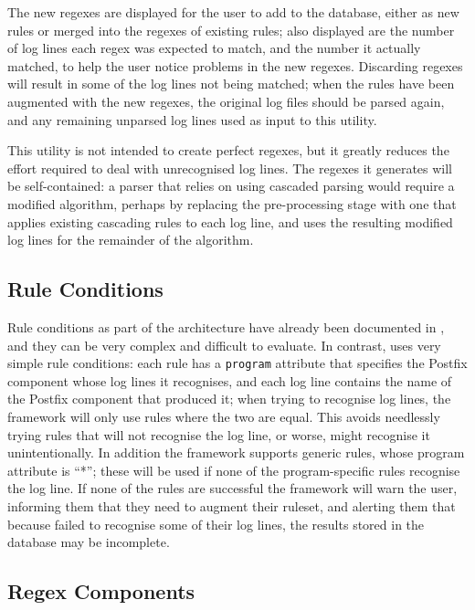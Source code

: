 The new regexes are displayed for the user to add to the database, either
as new rules or merged into the regexes of existing rules; also displayed
are the number of log lines each regex was expected to match, and the
number it actually matched, to help the user notice problems in the new
regexes.  Discarding regexes will result in some of the log lines not being
matched; when the rules have been augmented with the new regexes, the
original log files should be parsed again, and any remaining unparsed log
lines used as input to this utility.

This utility is not intended to create perfect regexes, but it greatly
reduces the effort required to deal with unrecognised log lines.  The
regexes it generates will be self-contained: a parser that relies on using
cascaded parsing would require a modified algorithm, perhaps by replacing
the pre-processing stage with one that applies existing cascading rules to
each log line, and uses the resulting modified log lines for the remainder
of the algorithm.

\subsection{Rule Conditions}

\label{rule conditions in implementation}

Rule conditions as part of the architecture have already been documented in
, and they can be very complex
and difficult to evaluate.  In contrast, \parsername{} uses very simple
rule conditions: each rule has a \texttt{program} attribute that specifies
the Postfix component whose log lines it recognises, and each log line
contains the name of the Postfix component that produced it; when trying to
recognise log lines, the framework will only use rules where the two are
equal.  This avoids needlessly trying rules that will not recognise the log
line, or worse, might recognise it unintentionally.  In addition the
framework supports generic rules, whose program attribute is ``*''; these
will be used if none of the program-specific rules recognise the log line.
If none of the rules are successful the framework will warn the user,
informing them that they need to augment their ruleset, and alerting them
that because \parsername{} failed to recognise some of their log lines, the
results stored in the database may be incomplete.

\subsection{Regex Components}

